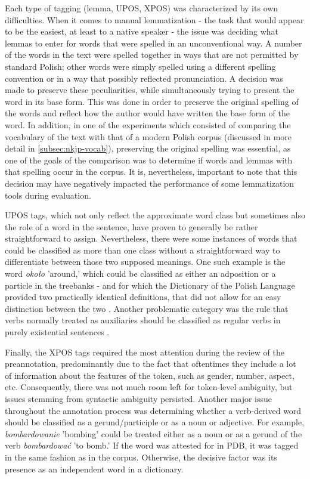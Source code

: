 Each type of tagging (lemma, UPOS, XPOS) was characterized by its own difficulties. When it comes to manual lemmatization - the task that would appear to be the easiest, at least to a native speaker - the issue was deciding what lemmas to enter for words that were spelled in an unconventional way. A number of the words in the text were spelled together in ways that are not permitted by standard Polish; other words were simply spelled using a different spelling convention or in a way that possibly reflected pronunciation. A decision was made to preserve these peculiarities, while simultaneously trying to present the word in its base form. This was done in order to preserve the original spelling of the words and reflect how the author would have written the base form of the word. In addition, in one of the experiments which consisted of comparing the vocabulary of the text with that of a modern Polish corpus (discussed in more detail in \autoref{subsec:nkjp-vocab}), preserving the original spelling was essential, as one of the goals of the comparison was to determine if words and lemmas with that spelling occur in the corpus. It is, nevertheless, important to note that this decision may have negatively impacted the performance of some lemmatization tools during evaluation. 

UPOS tags, which not only reflect the approximate word class but sometimes also the role of a word in the sentence, have proven to generally be rather straightforward to assign. Nevertheless, there were some instances of words that could be classified as more than one class without a straightforward way to differentiate between those two supposed meanings. One such example is the word \textit{około} 'around,' which could be classified as either an adposition or a particle in the treebanks - and for which the Dictionary of the Polish Language provided two practically identical definitions, that did not allow for an easy distinction between the two \citep{okolopwn}. Another problematic category was the rule that verbs normally treated as auxiliaries should be classified as regular verbs in purely existential sentences \citep{polishud}. 

Finally, the XPOS tags required the most attention during the review of the preannotation, predominantly due to the fact that oftentimes they include a lot of information about the features of the token, such as gender, number, aspect, etc. Consequently, there was not much room left for token-level ambiguity, but issues stemming from syntactic ambiguity persisted. Another major issue throughout the annotation process was determining whether a verb-derived word should be classified as a gerund/participle or as a noun or adjective. For example, \textit{bombardowanie} 'bombing' could be treated either as a noun or as a gerund of the verb \textit{bombardować} 'to bomb.' If the word was attested for in PDB, it was tagged in the same fashion as in the corpus. Otherwise, the decisive factor was its presence as an independent word in a dictionary.  

